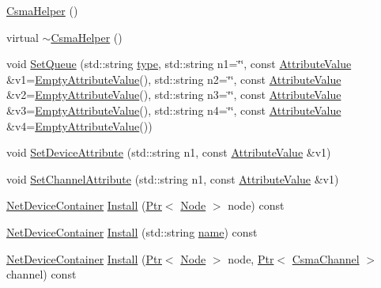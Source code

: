 \begin{DoxyCompactItemize}
\item 
\hyperlink{classns3_1_1CsmaHelper_a943e5f2d12a79674375c33a95dc563f0}{Csma\+Helper} ()
\item 
virtual \hyperlink{classns3_1_1CsmaHelper_a23c9e7b9cdf983cabc9a6783c340f49e}{$\sim$\+Csma\+Helper} ()
\item 
void \hyperlink{classns3_1_1CsmaHelper_abbe9eaa7f42523da7a97682378da8982}{Set\+Queue} (std\+::string \hyperlink{visualizer-ideas_8txt_add98db9e15e2a58cf2b57623e7aa893a}{type}, std\+::string n1=\char`\"{}\char`\"{}, const \hyperlink{classns3_1_1AttributeValue}{Attribute\+Value} \&v1=\hyperlink{classns3_1_1EmptyAttributeValue}{Empty\+Attribute\+Value}(), std\+::string n2=\char`\"{}\char`\"{}, const \hyperlink{classns3_1_1AttributeValue}{Attribute\+Value} \&v2=\hyperlink{classns3_1_1EmptyAttributeValue}{Empty\+Attribute\+Value}(), std\+::string n3=\char`\"{}\char`\"{}, const \hyperlink{classns3_1_1AttributeValue}{Attribute\+Value} \&v3=\hyperlink{classns3_1_1EmptyAttributeValue}{Empty\+Attribute\+Value}(), std\+::string n4=\char`\"{}\char`\"{}, const \hyperlink{classns3_1_1AttributeValue}{Attribute\+Value} \&v4=\hyperlink{classns3_1_1EmptyAttributeValue}{Empty\+Attribute\+Value}())
\item 
void \hyperlink{classns3_1_1CsmaHelper_a741c31b2526e3570cc62c9d7d9667ca9}{Set\+Device\+Attribute} (std\+::string n1, const \hyperlink{classns3_1_1AttributeValue}{Attribute\+Value} \&v1)
\item 
void \hyperlink{classns3_1_1CsmaHelper_a886d900b2fe44433e0b81752dea7e7f1}{Set\+Channel\+Attribute} (std\+::string n1, const \hyperlink{classns3_1_1AttributeValue}{Attribute\+Value} \&v1)
\item 
\hyperlink{classns3_1_1NetDeviceContainer}{Net\+Device\+Container} \hyperlink{classns3_1_1CsmaHelper_af79a91372595230b0817200270ab84e7}{Install} (\hyperlink{classns3_1_1Ptr}{Ptr}$<$ \hyperlink{classns3_1_1Node}{Node} $>$ node) const 
\item 
\hyperlink{classns3_1_1NetDeviceContainer}{Net\+Device\+Container} \hyperlink{classns3_1_1CsmaHelper_a768016bea6e8a1ba5ffa58fee9710be0}{Install} (std\+::string \hyperlink{generate__test__data__lte__spectrum__model_8m_ab74e6bf80237ddc4109968cedc58c151}{name}) const 
\item 
\hyperlink{classns3_1_1NetDeviceContainer}{Net\+Device\+Container} \hyperlink{classns3_1_1CsmaHelper_a8f2d1797ce0e6311c894517d5d84ddb1}{Install} (\hyperlink{classns3_1_1Ptr}{Ptr}$<$ \hyperlink{classns3_1_1Node}{Node} $>$ node, \hyperlink{classns3_1_1Ptr}{Ptr}$<$ \hyperlink{classns3_1_1CsmaChannel}{Csma\+Channel} $>$ channel) const 

\end{DoxyCompactItemize}
